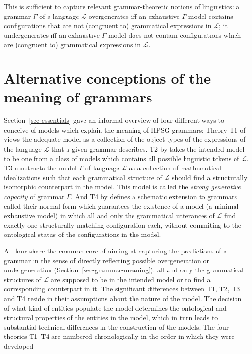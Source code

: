 \documentclass[output=paper
 	        ,biblatex
                ,babelshorthands
                ,newtxmath
                ,draftmode
                ,colorlinks, citecolor=brown
]{langscibook}
\begin{document}
{This is sufficient to capture relevant grammar-theoretic notions of
linguistics: a grammar $\Gamma$ of a language $\mathcal{L}$
overgenerates iff an exhaustive $\Gamma$ model contains configurations
that are not (congruent to) grammatical expressions in $\mathcal{L}$;
it undergenerates iff an exhaustive $\Gamma$ model does not contain
configurations which are (congruent to) grammatical expressions in
$\mathcal{L}$.




\section{Alternative conceptions of the meaning of grammars}
\label{sec-alt-gr-meaning}

Section~\ref{sec-essentials} gave an informal overview of four
different ways to conceive of models which explain the meaning of HPSG
grammars: Theory T1 of  views the adequate model
as a collection of the object types of the expressions of the language
$\mathcal{L}$ that a given grammar describes. T2 by \citet{King99a-u}
takes the intended model to be one from a class of models which contains
all possible linguistic tokens of $\mathcal{L}$.  T3
\citep{Pollard99a} constructs the model $\Gamma$ of language $\mathcal{L}$ as a
collection of mathematical idealizations such that each grammatical
structure of $\mathcal{L}$ should find a structurally isomorphic
counterpart in the model. This model is called the \emph{strong generative
capacity} of grammar $\Gamma$. And T4 by \citet{Richter2007a} defines a
schematic extension to grammars called their normal form which
guarantees the existence of a model (a minimal exhaustive model) in
which all and only the grammatical utterances of $\mathcal{L}$ find
exactly one structurally matching configuration each, without
commiting to the ontological status of the configurations in the
model.

All four share the common core of aiming at capturing the predictions
of a grammar in the sense of directly reflecting possible
overgeneration or undergeneration (Section~\ref{sec-grammar-meaning}):
all and only the grammatical structures of $\mathcal{L}$ are supposed
to be in the intended model or to find a corresponding counterpart in
it. The significant differences between T1, T2, T3 and T4 reside in
their assumptions about the nature of the model. The decision of what
kind of entities populate the model determines the ontological and
structural properties of the entities in the model, which in turn leads
to substantial technical differences in the construction of the
models.
The four theories T1--T4 are numbered chronologically in the order in
which they were developed.

}
\end{document}
